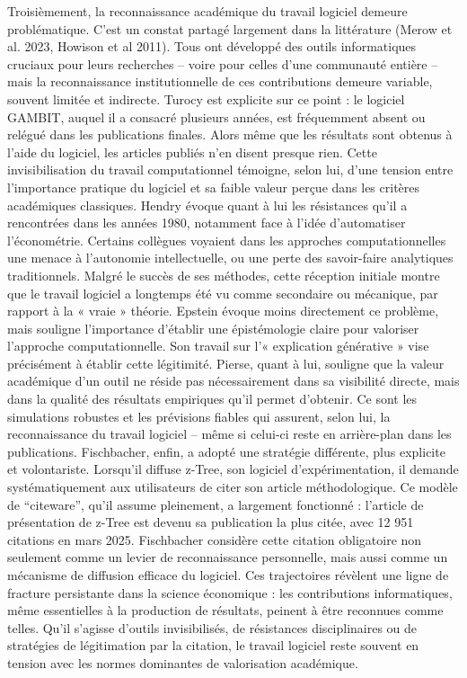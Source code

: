Troisièmement, la reconnaissance académique du travail logiciel demeure problématique. C'est un constat partagé largement dans la littérature (Merow et al. 2023\cite{merowBetterIncentivesAre2023}, Howison et al 2011\cite{howisonScientificSoftwareProduction2011}). Tous ont développé des outils informatiques cruciaux pour leurs recherches – voire pour celles d’une communauté entière – mais la reconnaissance institutionnelle de ces contributions demeure variable, souvent limitée et indirecte. Turocy est explicite sur ce point : le logiciel GAMBIT, auquel il a consacré plusieurs années, est fréquemment absent ou relégué dans les publications finales. Alors même que les résultats sont obtenus à l’aide du logiciel, les articles publiés n’en disent presque rien. Cette invisibilisation du travail computationnel témoigne, selon lui, d’une tension entre l’importance pratique du logiciel et sa faible valeur perçue dans les critères académiques classiques. Hendry évoque quant à lui les résistances qu’il a rencontrées dans les années 1980, notamment face à l’idée d’automatiser l’économétrie. Certains collègues voyaient dans les approches computationnelles une menace à l’autonomie intellectuelle, ou une perte des savoir-faire analytiques traditionnels. Malgré le succès de ses méthodes, cette réception initiale montre que le travail logiciel a longtemps été vu comme secondaire ou mécanique, par rapport à la « vraie » théorie. Epstein évoque moins directement ce problème, mais souligne l'importance d'établir une épistémologie claire pour valoriser l'approche computationnelle. Son travail sur l’« explication générative » vise précisément à établir cette légitimité. Pierse, quant à lui, souligne que la valeur académique d’un outil ne réside pas nécessairement dans sa visibilité directe, mais dans la qualité des résultats empiriques qu’il permet d’obtenir. Ce sont les simulations robustes et les prévisions fiables qui assurent, selon lui, la reconnaissance du travail logiciel – même si celui-ci reste en arrière-plan dans les publications. Fischbacher, enfin, a adopté une stratégie différente, plus explicite et volontariste. Lorsqu’il diffuse z-Tree, son logiciel d’expérimentation, il demande systématiquement aux utilisateurs de citer son article méthodologique. Ce modèle de “citeware”, qu’il assume pleinement, a largement fonctionné : l’article de présentation de z-Tree est devenu sa publication la plus citée, avec 12 951 citations en mars 2025. Fischbacher considère cette citation obligatoire non seulement comme un levier de reconnaissance personnelle, mais aussi comme un mécanisme de diffusion efficace du logiciel. Ces trajectoires révèlent une ligne de fracture persistante dans la science économique : les contributions informatiques, même essentielles à la production de résultats, peinent à être reconnues comme telles. Qu’il s’agisse d’outils invisibilisés, de résistances disciplinaires ou de stratégies de légitimation par la citation, le travail logiciel reste souvent en tension avec les normes dominantes de valorisation académique.


